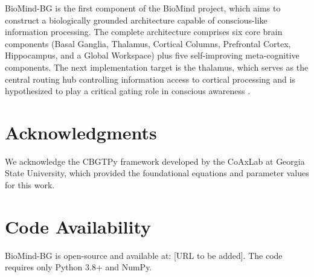 \documentclass[11pt,a4paper]{article}
\begin{document}
BioMind-BG is the first component of the BioMind project, which aims to construct a biologically grounded architecture capable of conscious-like information processing. The complete architecture comprises six core brain components (Basal Ganglia, Thalamus, Cortical Columns, Prefrontal Cortex, Hippocampus, and a Global Workspace) plus five self-improving meta-cognitive components. The next implementation target is the thalamus, which serves as the central routing hub controlling information access to cortical processing and is hypothesized to play a critical gating role in conscious awareness \citep{dehaene2011,seth2022}.

\section*{Acknowledgments}

We acknowledge the CBGTPy framework \citep{dunovan2019} developed by the CoAxLab at Georgia State University, which provided the foundational equations and parameter values for this work.

\section*{Code Availability}

BioMind-BG is open-source and available at: [URL to be added]. The code requires only Python 3.8+ and NumPy.


\end{document}
